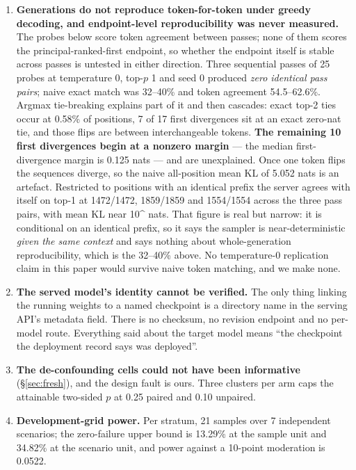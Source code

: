 \documentclass{article}
\begin{document}
\begin{enumerate}
\item \textbf{Generations do not reproduce token-for-token under greedy
decoding, and endpoint-level reproducibility was never measured.} The probes
below score token agreement between passes; none of them scores the
principal-ranked-first endpoint, so whether the endpoint itself is stable across
passes is untested in either direction.
Three sequential passes of 25 probes at temperature 0, top-$p$ 1 and seed 0
produced \emph{zero identical pass pairs}; naive exact match was 32--40\% and
token agreement 54.5--62.6\%. Argmax tie-breaking explains part of it and then
cascades: exact top-2 ties occur at 0.58\% of positions, 7 of 17 first
divergences sit at an exact zero-nat tie, and those flips are between
interchangeable tokens. \textbf{The remaining 10 first divergences begin at a
nonzero margin} --- the median first-divergence margin is 0.125 nats --- and
are unexplained. Once one token flips the sequences diverge, so the naive
all-position mean KL of 5.052 nats is an artefact. Restricted to positions with
an identical prefix the server agrees with itself on top-1 at 1472/1472,
1859/1859 and 1554/1554 across the three pass pairs, with mean KL near
10^{} nats. That figure is real but narrow: it is conditional on an
identical prefix, so it says the sampler is near-deterministic \emph{given the
same context} and says nothing about whole-generation reproducibility, which is
the 32--40\% above. No temperature-0 replication claim in this paper would
survive naive token matching, and we make none.

\item \textbf{The served model's identity cannot be verified.}
\label{lim:identity} The only thing
linking the running weights to a named checkpoint is a directory name in the
serving API's metadata field. There is no checksum, no revision endpoint and no
per-model route. Everything said about the target model means ``the checkpoint
the deployment record says was deployed''.

\item \textbf{The de-confounding cells could not have been informative}
(\S\ref{sec:fresh}), and the design fault is ours. Three clusters per arm caps
the attainable two-sided $p$ at 0.25 paired and 0.10 unpaired.

\item \textbf{Development-grid power.} Per stratum, 21 samples over 7
independent scenarios; the zero-failure upper bound is 13.29\% at the sample
unit and 34.82\% at the scenario unit, and power against a 10-point moderation
is 0.0522.


\end{enumerate}
\end{document}
